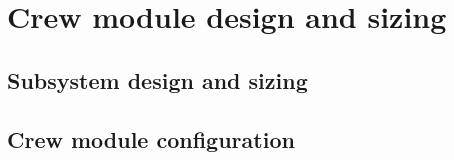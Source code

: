 \section{Crew module design and sizing}\label{ch:crewmod}

\subsection{Subsystem design and sizing} \label{sec:crewsubsys}


\subsection{Crew module configuration} \label{sec:crewpackaging}


